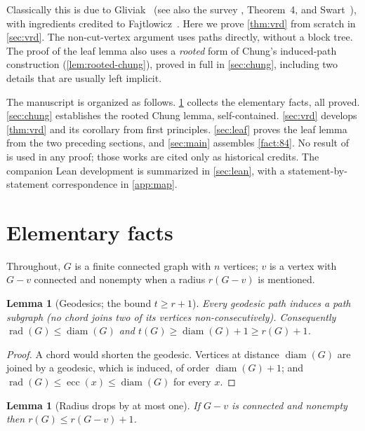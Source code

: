 \documentclass[11pt]{article}
\newtheorem{lemma}[theorem]{Lemma}
\theoremstyle{definition}
\newcommand{\rad}{\operatorname{rad}}
\newcommand{\ecc}{\operatorname{ecc}}
\newcommand{\diam}{\operatorname{diam}}
\begin{document}
Classically this is due to Gliviak~\cite{Gliviak1976} (see also the survey
\cite{Gliviak2000}, Theorem~4, and Swart~\cite[Theorem~2.2.10]{Swart1996}),
with ingredients credited to Fajtlowicz~\cite{Fajtlowicz1988}.  Here we
prove \cref{thm:vrd} from scratch in \cref{sec:vrd}.
The non-cut-vertex argument uses paths directly, without a block tree.
The proof of the leaf lemma also uses a \emph{rooted} form of Chung's
induced-path construction (\cref{lem:rooted-chung}), proved in full in
\cref{sec:chung}, including two details that are usually left implicit.

The manuscript is organized as follows.  \cref{sec:elem} collects the
elementary facts, all proved.  \cref{sec:chung} establishes the rooted Chung
lemma, self-contained.  \cref{sec:vrd} develops \cref{thm:vrd} and its
corollary from first principles.  \cref{sec:leaf} proves the leaf lemma from
the two preceding sections, and \cref{sec:main} assembles \cref{fact:84}.
No result of~\cite{ESS1986,Fajtlowicz1988,Gliviak1976,Gliviak2000,Swart1996}
is used in any proof; those works are cited only as historical credits.
The companion Lean development is summarized in \cref{sec:lean}, with a
statement-by-statement correspondence in \cref{app:map}.

\section{Elementary facts}\label{sec:elem}

Throughout, $G$ is a finite connected graph with $n$ vertices; $v$ is a
vertex with $G-v$ connected and nonempty when a radius $r(G-v)$ is mentioned.

\begin{lemma}[Geodesics; the bound $t\ge r+1$]\label{lem:geod}
Every geodesic path induces a path subgraph (no chord joins two of its
vertices non-consecutively).  Consequently
$\rad(G)\le\diam(G)$ and $t(G)\ge\diam(G)+1\ge r(G)+1$.
\end{lemma}

\begin{proof}
A chord would shorten the geodesic.  Vertices at distance $\diam(G)$ are
joined by a geodesic, which is induced, of order $\diam(G)+1$; and
$\rad(G)\le\ecc(x)\le\diam(G)$ for every $x$.
\end{proof}

\begin{lemma}[Radius drops by at most one]\label{lem:drop1}
If $G-v$ is connected and nonempty then $r(G)\le r(G-v)+1$.
\end{lemma}
\end{document}
